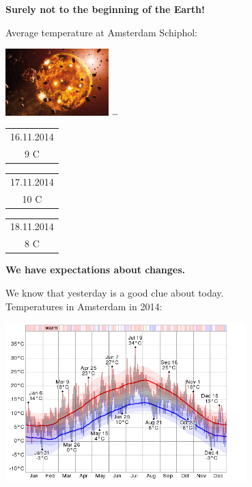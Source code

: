 \documentclass{beamer}
\newcommand{\pagestepalt}[2]{
  \begin{frame}[t]
    \begin{minipage}[t][0.26\textheight][t]{\textwidth}
      \begin{center}
        \huge
        \textbf{#1}
      \end{center}
    \end{minipage}
    
    \begin{minipage}[t][0.7\textheight][t]{\textwidth}
      #2
    \end{minipage}
  \end{frame}
}
\begin{document}
\pagestepalt{Surely not to the beginning of the Earth!}{
  Average temperature at Amsterdam Schiphol:\\
  \begin{flushright}
    \includegraphics[width=0.3\textwidth]{images/formation.jpg}
    {\Huge\ldots}
    \begin{tabular}{|c|}
      \hline
      16.11.2014 \\
      {\Huge 9 C} \\
      \hline
    \end{tabular}
    \begin{tabular}{|c|}
      \hline
      17.11.2014 \\
      {\Huge 10 C} \\
      \hline
    \end{tabular}
    \begin{tabular}{|c|}
      \hline
      18.11.2014 \\
      {\Huge 8 C} \\
      \hline
    \end{tabular}
  \end{flushright}
}
\pagestepalt{We have expectations about changes.}{
  We know that yesterday is a good clue about today. \\
  Temperatures in Amsterdam in 2014:
  \begin{center}
    \includegraphics[width=0.70\textwidth]{images/amstemp.png}
  \end{center}
}
\end{document}
